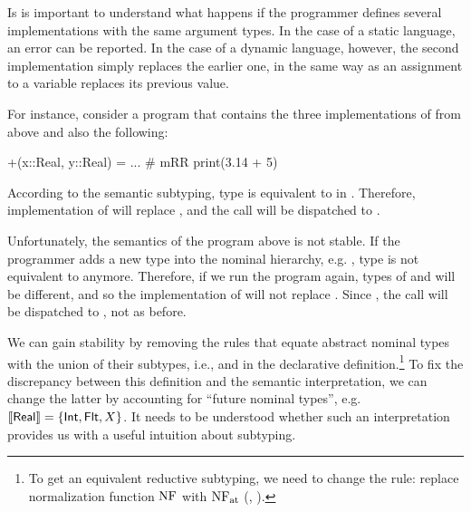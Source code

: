 Is is important to understand what happens if the programmer defines
several implementations with the same argument types. 
In the case of a static language, an error can be reported.
In the case of a dynamic language, however, the second implementation
simply replaces the earlier one, in the same way as an assignment
to a variable replaces its previous value.

For instance, consider a program 
that contains the three implementations of \jlcode{(+)} from above
and also the following:
\begin{lstminijl}
+(x::Real, y::Real) = ...   # mRR
print(3.14 + 5)	 
\end{lstminijl}
According to the semantic subtyping, type  is equivalent
to  in \BetaJulia. 
Therefore, implementation of  will replace , 
and the call  will be dispatched to .

Unfortunately, the semantics of the program above is not stable.
If the programmer adds a new type into the nominal hierarchy,
e.g. , type  is not
equivalent to  anymore.
Therefore, if we run the program again, types of  and 
will be different, and so the implementation of  
will not replace . 
Since , the call  
will be dispatched to , not  as before.

We can gain stability by removing the rules that 
equate abstract nominal types with the union of their subtypes,
i.e.,  and  in the declarative definition.\footnote{
    To get an equivalent reductive subtyping, we need to change 
    the  rule: replace normalization function $\mathop{\mathrm{NF}}$ with $\mathop{\mathrm{NF}_{\mathrm{at}}}$ 
    (, ).}
To fix the discrepancy between this definition and the semantic interpretation,
we can change the latter by accounting for ``future nominal types'',
e.g. $\llbracket \mathsf{Real} \rrbracket = \{\mathsf{Int}, \mathsf{Flt}, X\}$.
It needs to be understood whether such an interpretation provides us with
a useful intuition about subtyping.


